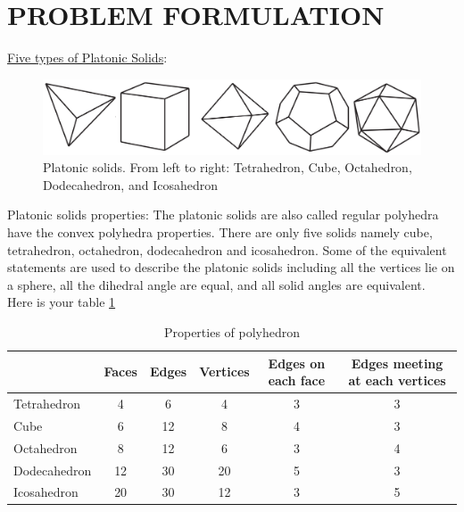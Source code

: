 \section{PROBLEM FORMULATION}
\label{sec:problemFormulation}
\noindent\uline{Five types of Platonic Solids}: 
\begin{figure}[h]
\centering
	\includegraphics[width=1\textwidth]{image/5Platonic.png}
	\caption{Platonic solids. From left to right: Tetrahedron, Cube, Octahedron, Dodecahedron, and Icosahedron}
	\label{fig:platonicSolids}
\end{figure}
%
% 
%
%
%
%
%
Platonic solids properties:
The platonic solids are also called regular polyhedra have the convex polyhedra properties. There are only five solids namely cube, tetrahedron, octahedron, dodecahedron and icosahedron. Some of the equivalent statements are used to describe the platonic solids including all the vertices lie on a sphere, all the dihedral angle are equal, and all solid angles are equivalent.\\

\noindent Here is your table \ref{tab:tb1}

\begin{table}[h]
\centering
\caption{Properties of polyhedron}
\label{tab:tb1}
\begin{tabular}{|l|c|c|c|c|c|}
\hline
             & Faces & Edges & Vertices & Edges on each face & Edges meeting at each vertices \\ \hline
Tetrahedron  & 4     & 6     & 4        & 3                  & 3                            \\ \hline
Cube         & 6     & 12    & 8        & 4                  & 3                            \\ \hline
Octahedron   & 8     & 12    & 6        & 3                  & 4                            \\ \hline
Dodecahedron & 12    & 30    & 20       & 5                  & 3                            \\ \hline
Icosahedron  & 20    & 30    & 12       & 3                  & 5                            \\ \hline
\end{tabular}
\end{table}







